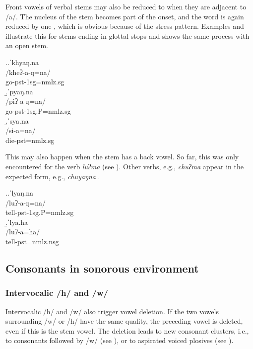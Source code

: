 Front vowels of verbal stems may also be reduced to  when they are adjacent to /a/. The  nucleus of the stem becomes part of the onset, and the word is again reduced by one , which is obvious because of the stress pattern. Examples \Next[a] and \Next[b] illustrate this for stems  ending in glottal stops and \Next[c] shows the same process with an open stem.


\ex.\a.\glll ˈkhyaŋ.na\\
/kheʔ-a-ŋ=na/\\
go{\sc -pst-1sg=nmlz.sg}\\
\b.\glll ˈpyaŋ.na\\
/piʔ-a-ŋ=na/\\
go{\sc [3sg.A]-pst-1sg.P=nmlz.sg}\\
\b.\glll  ˈsya.na\\
/si-a=na/\\
die{\sc [3sg]-pst=nmlz.sg}\\

This may also happen when the stem has a back vowel. So far, this was only encountered for the verb \emph{luʔma} (see \Next). Other verbs, e.g., \emph{chuʔma}  appear in the expected form, e.g.,  \emph{chuyaŋna} .

\ex.\a.\glll ˈlyaŋ.na\\
/luʔ-a-ŋ=na/\\
tell{\sc [3sg.A]-pst-1sg.P=nmlz.sg}\\
\b.\glll ˈlya.ha\\
/luʔ-a=ha/\\
tell{\sc [3sg.A;1.P]-pst=nmlz.nsg}\\


\subsection{Consonants in sonorous environment}\label{h-w-m}

\subsubsection{Intervocalic /h/ and /w/}
	
Intervocalic /h/ and /w/ also trigger vowel deletion. If the two vowels surrounding /w/ or /h/ have the same quality, the preceding vowel is deleted, even if this is the stem vowel. The deletion leads to new consonant clusters, i.e., to consonants followed by /w/ (see \Next[a]), or to aspirated voiced plosives (see \Next[b]). 

